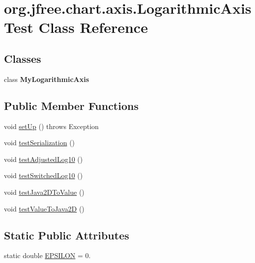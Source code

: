 \hypertarget{classorg_1_1jfree_1_1chart_1_1axis_1_1_logarithmic_axis_test}{}\section{org.\+jfree.\+chart.\+axis.\+Logarithmic\+Axis\+Test Class Reference}
\label{classorg_1_1jfree_1_1chart_1_1axis_1_1_logarithmic_axis_test}
\subsection*{Classes}
\begin{DoxyCompactItemize}
\item 
class {\bfseries My\+Logarithmic\+Axis}
\end{DoxyCompactItemize}
\subsection*{Public Member Functions}
\begin{DoxyCompactItemize}
\item 
void \mbox{\hyperlink{classorg_1_1jfree_1_1chart_1_1axis_1_1_logarithmic_axis_test_a960fa7bd8b59b66c0e62b93785243c88}{set\+Up}} ()  throws Exception 
\item 
void \mbox{\hyperlink{classorg_1_1jfree_1_1chart_1_1axis_1_1_logarithmic_axis_test_ae31ca56d39defef27c2312d861c02ecb}{test\+Serialization}} ()
\item 
void \mbox{\hyperlink{classorg_1_1jfree_1_1chart_1_1axis_1_1_logarithmic_axis_test_a86164257ab2bf9d5650d4ad218b3d637}{test\+Adjusted\+Log10}} ()
\item 
void \mbox{\hyperlink{classorg_1_1jfree_1_1chart_1_1axis_1_1_logarithmic_axis_test_a94fb4f0b01589b71fbe84cf590a8bf66}{test\+Switched\+Log10}} ()
\item 
void \mbox{\hyperlink{classorg_1_1jfree_1_1chart_1_1axis_1_1_logarithmic_axis_test_a5c0e16c6a45460696a59fa9898840758}{test\+Java2\+D\+To\+Value}} ()
\item 
void \mbox{\hyperlink{classorg_1_1jfree_1_1chart_1_1axis_1_1_logarithmic_axis_test_acc6aefaf37437a731f6e77416796da8b}{test\+Value\+To\+Java2D}} ()
\end{DoxyCompactItemize}
\subsection*{Static Public Attributes}
\begin{DoxyCompactItemize}
\item 
static double \mbox{\hyperlink{classorg_1_1jfree_1_1chart_1_1axis_1_1_logarithmic_axis_test_ab9b3e03ee48d2a8eb876f89f5b81f730}{E\+P\+S\+I\+L\+ON}} = 0.
\end{DoxyCompactItemize}



